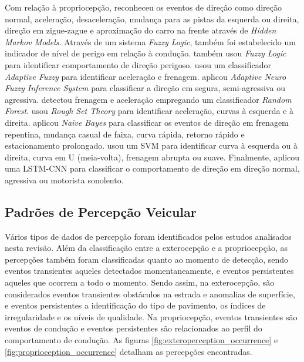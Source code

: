 Com relação à propriocepção, \cite{Wu2013} reconheceu os eventos de direção como direção normal, aceleração, desaceleração, mudança para as pistas da esquerda ou direita, direção em zigue-zague e aproximação do carro na frente através de \textit{Hidden Markov
Models}. Através de um sistema \textit{Fuzzy Logic}, também foi estabelecido um indicador de nível de perigo em relação à condução. \cite{Choudhary2014} também usou \textit{Fuzzy Logic} para identificar comportamento de direção perigoso. \cite{Arroyo2016} usou um classificador \textit{Adaptive Fuzzy} para identificar aceleração e frenagem. \cite{Eftekhari2018} aplicou \textit{Adaptive Neuro Fuzzy Inference System} para classificar a direção em segura, semi-agressiva ou agressiva. \cite{Bose2018} detectou frenagem e aceleração empregando um classificador \textit{Random Forest}. \cite{Vlahogianni2017} usou \textit{Rough Set Theory} para identificar aceleração, curvas à esquerda e à direita. \cite{Wu2018} aplicou \textit{Naïve Bayes} para classificar os eventos de direção em frenagem repentina, mudança casual de faixa, curva rápida, retorno rápido e estacionamento prolongado. \cite{Mahboob2017} usou um SVM para identificar curva à esquerda ou à direita, curva em U (meia-volta), frenagem abrupta ou suave. Finalmente, \cite{Saleh2017} aplicou uma LSTM-CNN para classificar o comportamento de direção em direção normal, agressiva ou motorista sonolento.

\subsection{Padrões de Percepção Veicular}

Vários tipos de dados de percepção foram identificados pelos estudos analisados nesta revisão. Além da classificação entre a exterocepção e a propriocepção, as percepções também foram classificadas quanto ao momento de detecção, sendo eventos transientes aqueles detectados momentaneamente, e eventos persistentes aqueles que ocorrem a todo o momento. 
Sendo assim, na exterocepção, são considerados eventos transientes obstáculos na estrada e anomalias de superfície, e eventos persistentes a identificação do tipo de pavimento, os índices de irregularidade e os níveis de qualidade. Na propriocepção, eventos transientes são eventos de condução e eventos persistentes são relacionados ao perfil do comportamento de condução. 
As figuras \ref{fig:exteroperception_occurrence} e \ref{fig:proprioception_occurrence} detalham as percepções encontradas.

